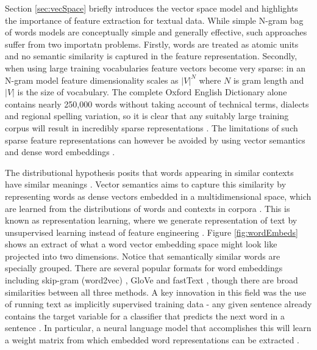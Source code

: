 \documentclass[Dissertation.tex]{subfiles}
\begin{document}
Section \ref{sec:vecSpace} briefly introduces the vector space model and highlights the importance of feature extraction for textual data. While simple N-gram bag of words models are conceptually simple and generally effective, such approaches suffer from two importatn problems. Firstly, words are treated as atomic units and no semantic similarity is captured in the feature representation. Secondly, when using large training vocabularies feature vectors become very sparse: in an N-gram model feature dimensionality scales as $ |V|^N $ where $ N $ is gram length and $ |V|  $ is the size of vocabulary.  The complete Oxford English Dictionary alone contains nearly 250,000 words \cite{HowManyWords} without taking account of technical terms, dialects and regional spelling variation, so it is clear that any suitably large training corpus will result in incredibly sparse representations \cite{jurafskySpeechLanguageProcessing}. The limitations of such sparse feature representations can however be avoided by using vector semantics and dense word embeddings \cite{jurafskySpeechLanguageProcessing}.

The distributional hypothesis  posits that words appearing in similar contexts have similar meanings \cite{sahlgren2008distributional}. Vector semantics aims to capture this similarity by representing words as dense vectors embedded in a multidimensional space, which are learned from the distributions of words and contexts in corpora \cite{jurafskySpeechLanguageProcessing}. This is known as representation learning, where we generate representation of text by unsupervised learning instead of feature engineering \cite{jurafskySpeechLanguageProcessing}. Figure \ref{fig:wordEmbeds} shows an extract of what a word vector embedding space might look like projected into two dimensions. Notice that semantically similar words are specially grouped. There are several popular formats for word embeddings including skip-gram (word2vec) \cite{mikolovEfficientEstimationWord2013}, GloVe \cite{penningtonGloveGlobalVectors2014} and fastText \cite{joulinBagTricksEfficient2016}, though there are broad similarities between all three methods. A key innovation in this field was the use of running text as implicitly supervised training data - any given sentence already contains the target variable for a classifier that predicts the next word in a sentence \cite{jurafskySpeechLanguageProcessing}. In particular, a neural language model that accomplishes this will learn a weight matrix from which embedded word representations can be extracted \cite{jurafskySpeechLanguageProcessing}. 
\end{document}
